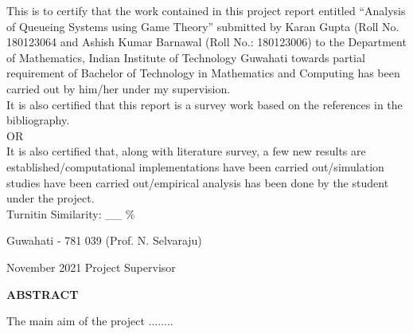 \documentclass[12pt,a4paper]{report}
\theoremstyle{plain}
\theoremstyle{definition}
\theoremstyle{remark}
\begin{document}
\noindent
This is to certify that the work contained in this project report entitled 
“Analysis of Queueing Systems using Game Theory” submitted by Karan Gupta (Roll No. 180123064 and Ashish Kumar Barnawal (Roll No.: 180123006) 
to the Department of Mathematics, Indian Institute of Technology Guwahati towards partial requirement of
Bachelor of Technology in Mathematics and Computing has been carried out by him/her under
my supervision. \\

\noindent
It is also certified that this report is a survey work based on the references
in the bibliography.\\

OR\\

\noindent
It is also certified that, along with literature survey,
a few new results are established/computational implementations have been carried
out/simulation studies have been carried out/empirical analysis
has been done by the student under the project.\\

\noindent
Turnitin Similarity: \_\_ \%
%

\vspace{4cm}

\noindent Guwahati - 781 039 \hfill (Prof. N. Selvaraju)

\noindent November 2021 \hfill Project Supervisor

\clearpage

\begin{center}
{\Large{\bf{ABSTRACT}}}
\end{center}


The main aim of the project ........

\clearpage



\tableofcontents
\clearpage
\listoffigures
\listoftables


\newpage

\setcounter{page}{1}














\nocite{laan}\nocite{rqhassin}\nocite{stidham}\nocite{gross}\nocite{osborne}\nocite{ferreira}



\end{document}
